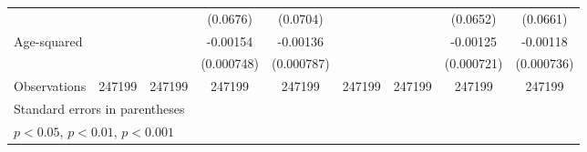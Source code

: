 \begin{table}[htbp]
\begin{tabular}{l*{8}{c}}
                         &                     &                     &    (0.0676)         &    (0.0704)         &                     &                     &    (0.0652)         &    (0.0661)         \\
[1em]
Age-squared              &                     &                     &    -0.00154\sym{*}  &    -0.00136         &                     &                     &    -0.00125         &    -0.00118         \\
                         &                     &                     &  (0.000748)         &  (0.000787)         &                     &                     &  (0.000721)         &  (0.000736)         \\
\hline
Observations             &      247199         &      247199         &      247199         &      247199         &      247199         &      247199         &      247199         &      247199         \\
\hline\hline
\multicolumn{9}{l}{\footnotesize Standard errors in parentheses}\\
\multicolumn{9}{l}{\footnotesize \sym{*} \(p<0.05\), \sym{**} \(p<0.01\), \sym{***} \(p<0.001\)}\\
\end{tabular}
\end{table}
